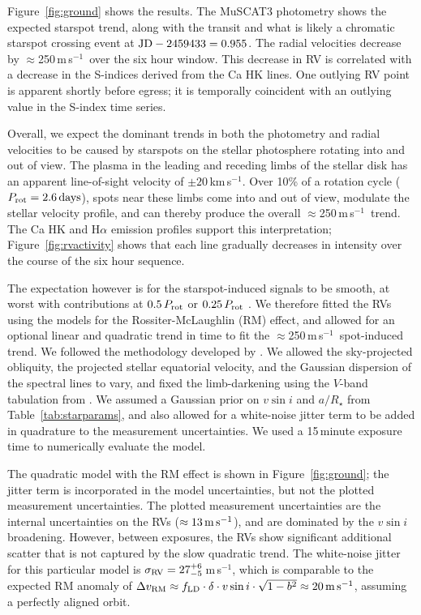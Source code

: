 \documentclass[12pt,modern,twocolumn,tighten]{aastex63}
\newcommand{\kms}{\,km\,s$^{-1}$}
\newcommand{\ms}{\,m\,s$^{-1}$}
\begin{document}
Figure~\ref{fig:ground} shows the results.  The MuSCAT3 photometry
shows the expected starspot trend, along with the transit and what is
likely a chromatic starspot crossing event at ${\rm JD} - 2459433 =
0.955$.  The radial velocities decrease by $\approx$250\ms\ over the
six hour window.  This decrease in RV is correlated with a decrease in
the S-indices derived from the Ca HK lines.  One outlying RV point is
apparent shortly before egress; it is temporally coincident with an
outlying value in the S-index time series.

Overall, we expect the dominant trends in both the photometry and
radial velocities to be caused by starspots on the stellar photosphere
rotating into and out of view.  The plasma in the leading and receding
limbs of the stellar disk has an apparent line-of-sight velocity of
$\pm 20$\kms.  Over 10\% of a rotation cycle ($P_{\rm rot}=2.6\,{\rm
days}$), spots near these limbs come into and out of view, modulate
the stellar velocity profile, and can thereby produce the overall
$\approx$250\ms\ trend.  The Ca HK and H$\alpha$ emission profiles
support this interpretation; Figure~\ref{fig:rvactivity} shows that
each line gradually decreases in intensity over the course of the six
hour sequence.

The expectation however is for the starspot-induced signals to be
smooth, at worst with contributions at $0.5\,P_{\rm rot}$ or
$0.25\,P_{\rm rot}$ \citep{klein_simulated_2020}.  We therefore fitted
the RVs using the \citet{hirano_analytic_2010,hirano_2011} models for
the Rossiter-McLaughlin (RM) effect, and allowed for an optional
linear and quadratic trend in time to fit the $\approx$250\ms\
spot-induced trend.  We followed the methodology developed by
\citet{stefansson_2020}.  We allowed the sky-projected obliquity, the
projected stellar equatorial velocity, and the Gaussian dispersion of
the spectral lines to vary, and fixed the limb-darkening using the
$V$-band tabulation from \citet{claret_gravity_2011}.  We assumed a
Gaussian prior on $v\sin i$ and $a/R_\star$ from
Table~\ref{tab:starparams}, and also allowed for a white-noise jitter
term to be added in quadrature to the measurement uncertainties.  We
used a 15\,minute exposure time to numerically evaluate the model.

The quadratic model with the RM effect is shown in
Figure~\ref{fig:ground}; the jitter term is incorporated in the model
uncertainties, but not the plotted measurement uncertainties.  The
plotted measurement uncertainties are the internal uncertainties on
the RVs ($\approx 13\,{\rm m\,s}^{-1}$), and are dominated by the
$v\sin i$ broadening.  However, between exposures, the RVs show
significant additional scatter that is not captured by the slow
quadratic trend.  The white-noise jitter for this particular model is
$\sigma_{\rm RV} = 27^{+6}_{-5}$\ms, which is comparable to the
expected RM anomaly of $\Delta v_{\rm RM} \approx f_{\rm LD} \cdot
\delta \cdot v\sin i \cdot \sqrt{1-b^2} \approx 20\,{\rm m\,s}^{-1}$,
assuming a perfectly aligned orbit.
\end{document}
